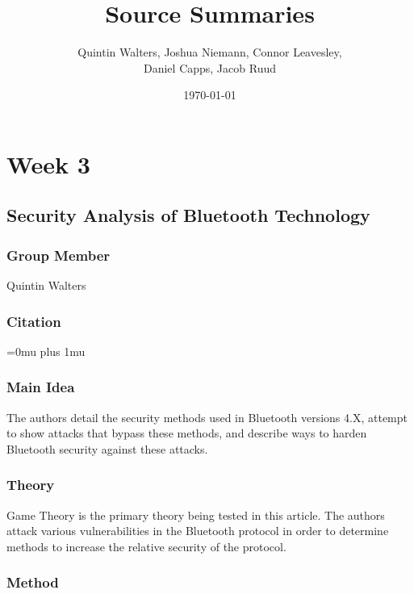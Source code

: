 \documentclass[letterpaper,12pt]{article}
\begin{document}
	\nobibliography*
	
    \title{Source Summaries}
    \author{Quintin Walters, Joshua Niemann, Connor Leavesley,\\
    Daniel Capps, Jacob Ruud}
    \date{\today}
    \maketitle
\break
\setcounter{tocdepth}{2}\tableofcontents
\break

\section{Week 3}

\noindent
\subsection{Security Analysis of Bluetooth Technology}

\subsubsection{Group Member}

\noindent
Quintin Walters

\noindent
\subsubsection{Citation}

\Urlmuskip=0mu plus 1mu\relax
{}

\subsubsection{Main Idea}

\noindent
The authors detail the security methods used in Bluetooth versions 4.X, attempt to show attacks that bypass these methods, and describe ways to harden Bluetooth security against these attacks.  

\subsubsection{Theory}

\noindent
Game Theory is the primary theory being tested in this article.  The authors attack various vulnerabilities in the Bluetooth protocol in order to determine methods to increase the relative security of the protocol.

\subsubsection{Method}
\end{document}
